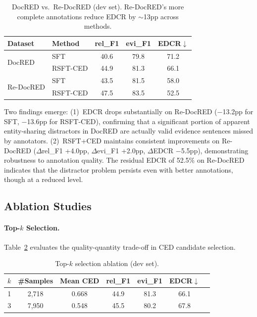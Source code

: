 \documentclass[11pt,a4paper]{article}
\begin{document}
\begin{table}[t]
\centering
\small
\begin{tabular}{llccc}
\toprule
\textbf{Dataset} & \textbf{Method} & \textbf{rel\_F1} & \textbf{evi\_F1} & \textbf{EDCR}$\downarrow$ \\
\midrule
\multirow{2}{*}{DocRED} & SFT & 40.6 & 79.8 & 71.2 \\
 & RSFT-CED & 44.9 & 81.3 & 66.1 \\
\midrule
\multirow{2}{*}{Re-DocRED} & SFT & 43.5 & 81.5 & 58.0 \\
 & RSFT-CED & 47.5 & 83.5 & 52.5 \\
\bottomrule
\end{tabular}
\caption{DocRED vs.\ Re-DocRED (dev set). Re-DocRED's more complete annotations reduce EDCR by $\sim$13pp across methods.}
\label{tab:redocred}
\end{table}

Two findings emerge: (1)~EDCR drops substantially on Re-DocRED ($-$13.2pp for SFT, $-$13.6pp for RSFT-CED), confirming that a significant portion of apparent entity-sharing distractors in DocRED are actually valid evidence sentences missed by annotators. (2)~RSFT+CED maintains consistent improvements on Re-DocRED ($\Delta$rel\_F1 +4.0pp, $\Delta$evi\_F1 +2.0pp, $\Delta$EDCR $-$5.5pp), demonstrating robustness to annotation quality. The residual EDCR of 52.5\% on Re-DocRED indicates that the distractor problem persists even with better annotations, though at a reduced level.

\subsection{Ablation Studies}

\paragraph{Top-$k$ Selection.}
Table~\ref{tab:topk} evaluates the quality-quantity trade-off in CED candidate selection.

\begin{table}[t]
\centering
\small
\begin{tabular}{ccccccc}
\toprule
\textbf{$k$} & \textbf{\#Samples} & \textbf{Mean CED} & \textbf{rel\_F1} & \textbf{evi\_F1} & \textbf{EDCR}$\downarrow$ \\
\midrule
1 & 2,718 & 0.668 & 44.9 & 81.3 & 66.1 \\
3 & 7,950 & 0.548 & 45.5 & 80.2 & 67.8 \\
\bottomrule
\end{tabular}
\caption{Top-$k$ selection ablation (dev set).}
\label{tab:topk}
\end{table}
\end{document}
